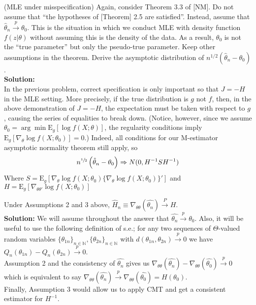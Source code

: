 \documentclass[11pt,letterpaper]{article}                  %
\begin{document}
\bigskip
\begin{problem} (MLE under misspecification) Again, consider Theorem 3.3 of [NM]. Do not assume that ``the hypotheses of [Theorem] 2.5 are satisfied''. Instead, assume that $\hat{\theta}_n \xrightarrow{p} \theta_0$. This is the situation in which we conduct MLE with density function $f(z | \theta)$ without assuming this is the density of the data. As a result, $\theta_0$ is not the ``true parameter'' but only the pseudo-true parameter. Keep other assumptions in the theorem. Derive the asymptotic distribution of $n^{1/2} ( \hat{\theta}_n - \theta_0 )$. \\
	
	\textbf{Solution:} \\
	
In the previous problem, correct specification is only important so
that $J = -H$ in the MLE setting. More precisely, if the true
distribution is $g$ not $f$, then, in the above demonstration of $J =
- H$, the expectation must be taken with respect to $g$, causing the
series of equalities to break down. (Notice, however, since we assume $\theta_0
= \arg\min \mathrm{E}_g[\log f(X;\theta)]$, the regularity conditions
imply $\mathrm{E}_g[\nabla_{\theta}\log f(X;\theta_0)] = 0$.) Indeed,
all conditions for
our M-estimator asymptotic normality theorem still apply, so
\begin{equation*}
  n^{\sfrac{1}{2}}\left( \hat{\theta}_n - \theta_0 \right) \Rightarrow
  N(0, H^{-1}S H^{-1})
\end{equation*}
Where $S = \mathrm{E}_g\left[\nabla_{\theta}\log f(X; \theta_0) \{\nabla_{\theta}\log
f(X; \theta_0)\}'\right]$ and $H = \mathrm{E}_g\left[ \nabla_{\theta\theta'}
  \log f(X; \theta_0)\right]$

\end{problem}

\bigskip
\begin{problem}
Under Assumptions 2 and 3 above, $\hat{H}_n \equiv \nabla_{\theta\theta}(\widehat{\theta_n}) \overset{P}{\rightarrow} H$.\\

\textbf{Solution:} We will assume throughout the answer that $\widehat{\theta_n}\overset{p}{\rightarrow}\theta_0$. Also, it will be useful to use the following definition of s.e.; for any two sequences of $\Theta$-valued random variables $\{\theta_{1n}\}_{n\in\mathbb{N}}, \{\theta_{2n}\}_{n\in\mathbb{N}}$ with $d(\theta_{1n},\theta_{2n})\overset{p}{\rightarrow}0$ we have $Q_n(\theta_{1n}) - Q_n(\theta_{2n})\overset{p}{\rightarrow}0$.\\

Assumption 2 and the consistency of $\widehat{\theta_n}$ gives us $\nabla_{\theta\theta}(\widehat{\theta_n}) - \nabla_{\theta\theta}(\widehat{\theta_0}) \overset{p}{\rightarrow}0$ which is equivalent to say $\nabla_{\theta\theta}(\widehat{\theta_n}) \overset{p}{\rightarrow} \nabla_{\theta\theta}(\widehat{\theta_0}) = H(\theta_0)$.\\

Finally, Assumption 3 would allow us to apply CMT and get a consistent estimator for $H^{-1}$.
\end{problem}
\end{document}
